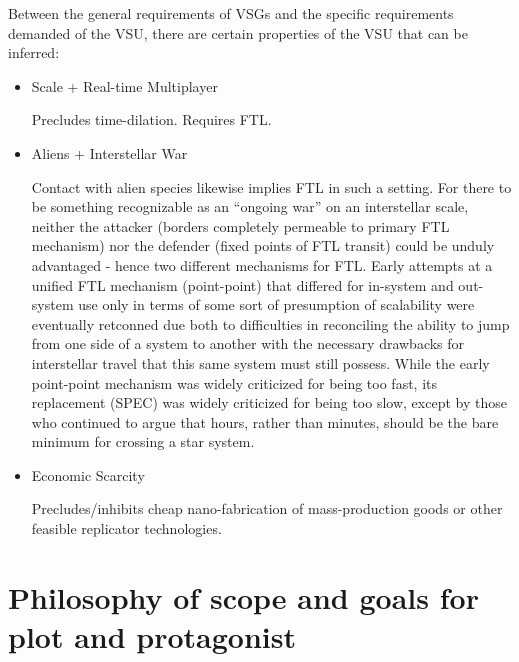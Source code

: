 Between the general requirements of VSGs and the specific requirements
demanded of the VSU, there are certain properties of the VSU that can
be inferred:

\begin{itemize}

\item Scale + Real-time Multiplayer

Precludes time-dilation. Requires FTL.

\item Aliens + Interstellar War

Contact with alien species likewise implies FTL in such a setting. For there to be
something recognizable as an ``ongoing war'' on an interstellar
scale, neither the attacker (borders completely permeable to primary
FTL mechanism) nor the defender (fixed points of FTL transit) could be
unduly advantaged - hence two different mechanisms for FTL. Early
attempts at a unified FTL mechanism (point-point) that differed for
in-system and out-system use only in terms of some sort of presumption
of scalability were eventually retconned due both to difficulties in
reconciling the ability to jump from one side of a system to another
with the necessary drawbacks for interstellar travel that this same
system must still possess. While the early point-point mechanism was
widely criticized for being too fast, its replacement (SPEC) was
widely criticized for being too slow, except by those who continued to
argue that hours, rather than minutes, should be the bare minimum for
crossing a star system.


\item Economic Scarcity

Precludes/inhibits cheap nano-fabrication of mass-production goods or
other feasible replicator technologies.

\end{itemize}

\section{Philosophy of scope and goals for plot and protagonist}
\label{sec:plottingphilosophy}

